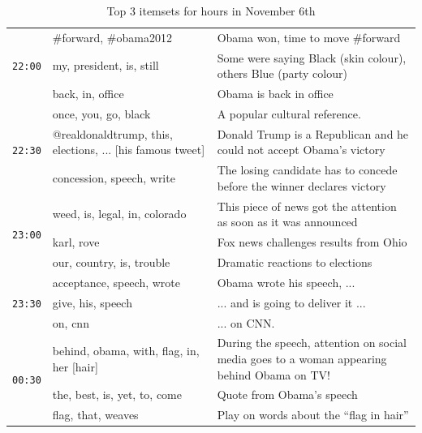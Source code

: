 \documentclass{sig-alternate}
\begin{document}
\begin{table}
\begin{center}
\begin{tabular}{|p{.6cm}|p{2.5cm}|p{5cm}|}
\multirow{3}{*}{\texttt{22:00}} 	& \#forward, \#obama2012		&  Obama won, time to move \#forward \\ \cline{2-3}
					   	& my, president, is, still		& Some were saying Black (skin colour), others Blue (party colour) \\ \cline{2-3}
						& back, in, office		&   Obama is back in office\\\hline

\multirow{3}{*}{\texttt{22:30}} 	& once, you, go, black		& A popular cultural reference.\\ \cline{2-3} %
					   	& @realdonaldtrump, this, elections, ... [his famous tweet] 		& Donald Trump is a Republican and he could not accept Obama's victory\\ \cline{2-3}
						& concession, speech, write		&   The losing candidate has to concede before the winner declares victory \\\hline
						
\multirow{3}{*}{\texttt{23:00}} 	& weed, is, legal, in, colorado		&  This piece of news got the attention as soon as it was announced  \\ \cline{2-3}
					   	& karl, rove		& Fox news challenges results from Ohio\\ \cline{2-3}
						& our, country, is, trouble		&   Dramatic reactions to elections \\\hline						
\multirow{3}{*}{\texttt{23:30}} 	& acceptance, speech, wrote		&  Obama wrote his speech, ...\\ \cline{2-3}
					   	& give, his, speech		& ... and is going to deliver it ... \\ \cline{2-3}
						& on, cnn		&   ... on CNN. \\\hline	
						
\multirow{3}{*}{\texttt{00:30}} 	& behind, obama, with, flag, in, her [hair]		&  During the speech, attention on social media goes to a woman appearing behind Obama on TV! \\ \cline{2-3}
					   	& the, best, is, yet, to, come		&  Quote from Obama's speech\\ \cline{2-3}
						& flag, that, weaves	& Play on words about the ``flag in hair'' \\\hline																			
\end{tabular}
\end{center}
\caption{Top 3 itemsets for hours in November 6th}
 \label{table:nov6}
\end{table}
\end{document}
